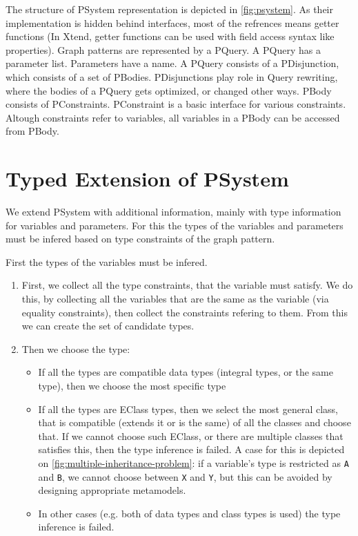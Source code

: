 The structure of PSystem representation is depicted in \autoref{fig:psystem}. 
As their implementation is hidden behind interfaces, most of the refrences means getter functions (In Xtend, getter functions can be used with field access syntax like \csharp{} properties). 
Graph patterns are represented by a PQuery. 
A PQuery has a parameter list. 
Parameters have a name.
A PQuery consists of a PDisjunction, which consists of a set of PBodies. 
PDisjunctions play role in Query rewriting, where the bodies of a PQuery gets optimized, or changed other ways.
PBody consists of PConstraints. 
PConstraint is a basic interface for various constraints. 
Altough constraints refer to variables, all variables in a PBody can be accessed from PBody.




\section{Typed Extension of PSystem}

We extend PSystem with additional information, mainly with type information for variables and parameters.
For this the types of the variables and parameters must be infered based on type constraints of the graph pattern.

First the types of the variables must be infered. 
\begin{enumerate}
	\item 
	First, we collect all the type constraints, that the variable must satisfy.
	We do this, by collecting all the variables that are the same as the variable (via equality constraints), 
	then collect the constraints refering to them.
	From this we can create the set of candidate types.
	\item
	Then we choose the type:
	\begin{itemize}
		\item
		If all the types are compatible data types (integral types, or the same type), then we choose the most specific type
		\item
		If all the types are EClass types, then we select the most general class, that is compatible (extends it or is the same) of all the classes and choose that.
		If we cannot choose such EClass, or there are multiple classes that satisfies this, then the type inference is failed.
		A case for this is depicted on \autoref{fig:multiple-inheritance-problem}: if a variable's type is restricted as \texttt{A} and \texttt{B}, we cannot choose between \texttt{X} and \texttt{Y}, but this can be avoided by designing appropriate metamodels.
		\item
		In other cases (e.g. both of data types and class types is used) the type inference is failed.
	\end{itemize}
\end{enumerate}


